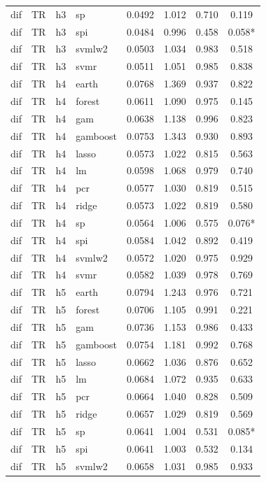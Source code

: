 \begin{ThreePartTable}
\begin{longtable}[t]{llclcccc}
dif & TR & h3 & sp & 0.0492 & 1.012 & 0.710 & 0.119\\
dif & TR & h3 & spi & 0.0484 & 0.996 & 0.458 & 0.058*\\
dif & TR & h3 & svmlw2 & 0.0503 & 1.034 & 0.983 & 0.518\\
dif & TR & h3 & svmr & 0.0511 & 1.051 & 0.985 & 0.838\\
\addlinespace
dif & TR & h4 & earth & 0.0768 & 1.369 & 0.937 & 0.822\\
dif & TR & h4 & forest & 0.0611 & 1.090 & 0.975 & 0.145\\
dif & TR & h4 & gam & 0.0638 & 1.138 & 0.996 & 0.823\\
dif & TR & h4 & gamboost & 0.0753 & 1.343 & 0.930 & 0.893\\
dif & TR & h4 & lasso & 0.0573 & 1.022 & 0.815 & 0.563\\
dif & TR & h4 & lm & 0.0598 & 1.068 & 0.979 & 0.740\\
dif & TR & h4 & pcr & 0.0577 & 1.030 & 0.819 & 0.515\\
dif & TR & h4 & ridge & 0.0573 & 1.022 & 0.819 & 0.580\\
dif & TR & h4 & sp & 0.0564 & 1.006 & 0.575 & 0.076*\\
dif & TR & h4 & spi & 0.0584 & 1.042 & 0.892 & 0.419\\
dif & TR & h4 & svmlw2 & 0.0572 & 1.020 & 0.975 & 0.929\\
dif & TR & h4 & svmr & 0.0582 & 1.039 & 0.978 & 0.769\\
\addlinespace
dif & TR & h5 & earth & 0.0794 & 1.243 & 0.976 & 0.721\\
dif & TR & h5 & forest & 0.0706 & 1.105 & 0.991 & 0.221\\
dif & TR & h5 & gam & 0.0736 & 1.153 & 0.986 & 0.433\\
dif & TR & h5 & gamboost & 0.0754 & 1.181 & 0.992 & 0.768\\
dif & TR & h5 & lasso & 0.0662 & 1.036 & 0.876 & 0.652\\
dif & TR & h5 & lm & 0.0684 & 1.072 & 0.935 & 0.633\\
dif & TR & h5 & pcr & 0.0664 & 1.040 & 0.828 & 0.509\\
dif & TR & h5 & ridge & 0.0657 & 1.029 & 0.819 & 0.569\\
dif & TR & h5 & sp & 0.0641 & 1.004 & 0.531 & 0.085*\\
dif & TR & h5 & spi & 0.0641 & 1.003 & 0.532 & 0.134\\
dif & TR & h5 & svmlw2 & 0.0658 & 1.031 & 0.985 & 0.933\\

\end{longtable}
\end{ThreePartTable}

